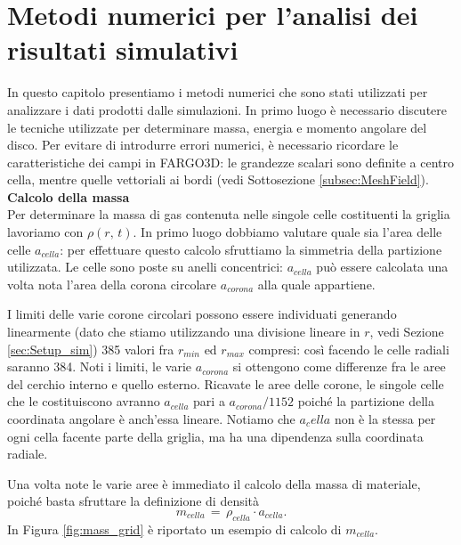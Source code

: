 \chapter{Metodi numerici per l'analisi dei risultati simulativi}

In questo capitolo presentiamo i metodi numerici che sono stati utilizzati per analizzare i dati prodotti dalle simulazioni. In primo luogo è necessario discutere le tecniche utilizzate per determinare massa, energia e momento angolare del disco.
Per evitare di introdurre errori numerici, è necessario ricordare le caratteristiche dei campi in FARGO3D: le grandezze scalari sono definite a centro cella, mentre quelle vettoriali ai bordi (vedi Sottosezione \ref{subsec:MeshField}).\\

\textbf{Calcolo della massa}\\

Per determinare la massa di gas contenuta nelle singole celle costituenti la griglia lavoriamo con $\rho(r,\,t)$. In primo luogo dobbiamo valutare quale sia l'area delle celle $a_{cella}$: per effettuare questo calcolo sfruttiamo la simmetria della partizione utilizzata. Le celle sono poste su anelli concentrici: $a_{cella}$ può essere calcolata una volta nota l'area della corona circolare $a_{corona}$ alla quale appartiene.

I limiti delle varie corone circolari possono essere individuati generando linearmente (dato che stiamo utilizzando una divisione lineare in $r$, vedi Sezione \ref{sec:Setup_sim}) 385 valori fra $r_{min}$ ed $r_{max}$ compresi: così facendo le celle radiali saranno 384. Noti i limiti, le varie $a_{corona}$ si ottengono come differenze fra le aree del cerchio interno e quello esterno.
Ricavate le aree delle corone, le singole celle che le costituiscono avranno $a_{cella}$ pari a $a_{corona}/1152$ poiché la partizione della coordinata angolare è anch'essa lineare.
Notiamo che $a_cella$ non è la stessa per ogni cella facente parte della griglia, ma ha una dipendenza sulla coordinata radiale.

Una volta note le varie aree è immediato il calcolo della massa di materiale, poiché basta sfruttare la definizione di densità
\begin{equation}
m_{cella}\,=\,\rho_{cella} \cdot a_{cella}.
\label{eq:mass_cella}
\end{equation}
In Figura \ref{fig:mass_grid} è riportato un esempio di calcolo di $m_{cella}$.

